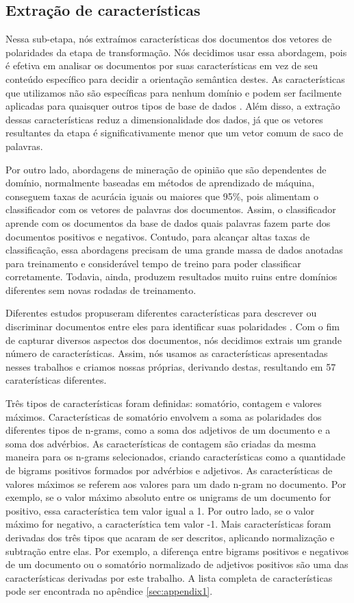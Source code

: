\subsection{Extração de características}

Nessa sub-etapa, nós extraímos características dos documentos dos vetores de polaridades da etapa de transformação. Nós decidimos usar essa abordagem, pois é efetiva em analisar os documentos por suas características em vez de seu conteúdo específico para decidir a orientação semântica destes. As características que utilizamos não são específicas para nenhum domínio e podem ser facilmente aplicadas para quaisquer outros tipos de base de dados \cite{pang2002thumbs}. Além disso, a extração dessas características reduz a dimensionalidade dos dados, já que os vetores resultantes da etapa é significativamente menor que um vetor comum de saco de palavras.

Por outro lado, abordagens de mineração de opinião que são dependentes de domínio, normalmente baseadas em métodos de aprendizado de máquina, conseguem taxas de acurácia iguais ou maiores que 95\%, pois alimentam o classificador com os vetores de palavras dos documentos. Assim, o classificador aprende com os documentos da base de dados quais palavras fazem parte dos documentos positivos e negativos. Contudo, para alcançar altas taxas de classificação, essa abordagens precisam de uma grande massa de dados anotadas para treinamento e considerável tempo de treino para poder classificar corretamente. Todavia, ainda, produzem resultados muito ruins entre domínios diferentes sem novas rodadas de treinamento.

Diferentes estudos propuseram diferentes características para descrever ou discriminar documentos entre eles para identificar suas polaridades \cite{wilson2005recognizing, ohana2009sentiment, taboada2011lexicon}. Com o fim de capturar diversos aspectos dos documentos, nós decidimos extrais um grande número de características. Assim, nós usamos as características apresentadas nesses trabalhos e criamos nossas próprias, derivando destas, resultando em 57 caraterísticas diferentes.

Três tipos de características foram definidas: somatório, contagem e valores máximos. Características de somatório envolvem a soma as polaridades dos diferentes tipos de n-grams, como a soma dos adjetivos de um documento e a soma dos advérbios. As características de contagem são criadas da mesma maneira para os n-grams selecionados, criando características como a quantidade de bigrams positivos formados por advérbios e adjetivos. As características de valores máximos se referem aos valores para um dado n-gram no documento. Por exemplo, se o valor máximo absoluto entre os unigrams de um documento for positivo, essa característica tem valor igual a 1. Por outro lado, se o valor máximo for negativo, a característica tem valor -1. Mais características foram derivadas dos três tipos que acaram de ser descritos, aplicando normalização e subtração entre elas. Por exemplo, a diferença entre bigrams positivos e negativos de um documento ou o somatório normalizado de adjetivos positivos são uma das características derivadas por este trabalho. A lista completa de características pode ser encontrada no apêndice \ref{sec:appendix1}.

